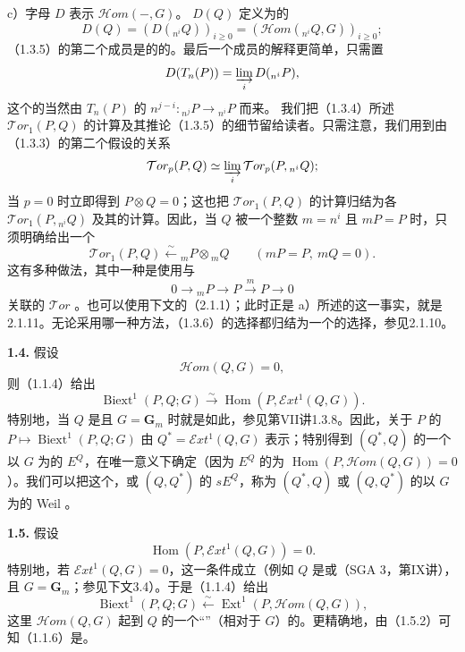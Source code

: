  c）字母 $D$ 表示 $\mathcal Hom(-,G)$。 $D(Q)$ 定义为的
\[D(Q)=(D({}_{n^i}Q))_{i\geq0}=(\mathcal Hom({}_{n^i}Q,G))_{i\geq0};\]
（1.3.5）的第二个成员是的的。最后一个成员的解释更简单，只需置
\[D(T_n(P))=\varinjlim_i D({}_{n^i}P),\]
这个的当然由 $T_n(P)$ 的
$n^{j-i}:{}_{n^j}P\longrightarrow{}_{n^i}P$ 而来。
我们把（1.3.4）所述 $\mathcal Tor_1(P,Q)$ 的计算及其推论（1.3.5）的细节留给读者。只需注意，我们用到由（1.3.3）的第二个假设的关系
\[\mathcal Tor_p(P,Q)\simeq\varinjlim_i\mathcal Tor_p(P,{}_{n^i}Q);\]
当 $p=0$ 时立即得到 $P\otimes Q=0$；这也把 $\mathcal Tor_1(P,Q)$ 的计算归结为各 $\mathcal Tor_1(P,{}_{n^i}Q)$ 及其的计算。因此，当 $Q$ 被一个整数 $m=n^i$ 且 $mP=P$ 时，只须明确给出一个
\[\mathcal Tor_1(P,Q)\xleftarrow{\sim}{}_{m}P\otimes{}_{m}Q
\qquad(mP=P,\ mQ=0).\tag{1.3.6}\]
这有多种做法，其中一种是使用与
\[0\longrightarrow{}_{m}P\longrightarrow P\xrightarrow{m}P\longrightarrow0\]
关联的 $\mathcal Tor$ 。也可以使用下文的（2.1.1）；此时正是 a）所述的这一事实，就是2.1.11。无论采用哪一种方法，（1.3.6）的选择都归结为一个的选择，参见2.1.10。

\textbf{1.4.} 假设
\[\mathcal Hom(Q,G)=0,\tag{1.4.1}\]
则（1.1.4）给出
\[\operatorname{Biext}^1(P,Q;G)\xrightarrow{\sim}\operatorname{Hom}(P,\mathcal Ext^1(Q,G)).\tag{1.4.2}\]
特别地，当 $Q$ 是且 $G=\mathbf G_m$ 时就是如此，参见第VII讲1.3.8。因此，关于 $P$ 的 $P\mapsto\operatorname{Biext}^1(P,Q;G)$ 由 $Q^*=\mathcal Ext^1(Q,G)$ 表示；特别得到 $(Q^*,Q)$ 的一个以 $G$ 为的 $E^Q$，在唯一意义下确定（因为 $E^Q$ 的为 $\operatorname{Hom}(P,\mathcal Hom(Q,G))=0$）。我们可以把这个，或 $(Q,Q^*)$ 的 $sE^Q$，称为 $(Q^*,Q)$ 或 $(Q,Q^*)$ 的以 $G$ 为的 Weil 。

\textbf{1.5.} 假设
\[\operatorname{Hom}(P,\mathcal Ext^1(Q,G))=0.\tag{1.5.1}\]
特别地，若 $\mathcal Ext^1(Q,G)=0$，这一条件成立（例如 $Q$ 是或（SGA 3，第IX讲），且 $G=\mathbf G_m$；参见下文3.4）。于是（1.1.4）给出
\[\operatorname{Biext}^1(P,Q;G)\xleftarrow{\sim}\operatorname{Ext}^1(P,\mathcal Hom(Q,G)),\tag{1.5.2}\]
这里 $\mathcal Hom(Q,G)$ 起到 $Q$ 的一个“”（相对于 $G$）的。更精确地，由（1.5.2）可知（1.1.6）是。

